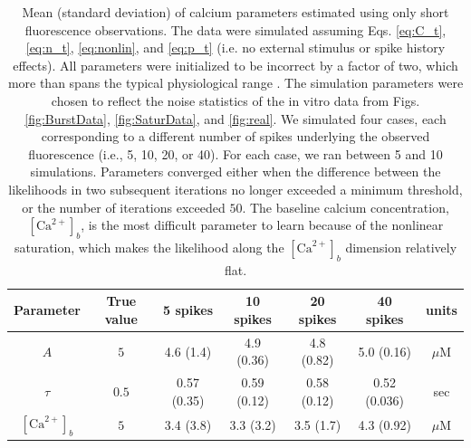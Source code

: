 \documentclass[10pt]{article}
\newcommand{\Ca}{[\text{Ca}^{2+}]}
\begin{document}
\begin{table}[h]
\caption{Mean (standard deviation) of calcium parameters estimated using only short fluorescence observations. The data were simulated assuming Eqs. \ref{eq:C_t}, \ref{eq:n_t}, \ref{eq:nonlin}, and \ref{eq:p_t} (i.e. no external stimulus or spike history effects). All parameters were initialized to be incorrect by a factor of two, which more than spans the typical physiological range \cite{YaksiFriedrich06}. The simulation parameters were chosen to reflect the noise statistics of the in vitro data from Figs. \ref{fig:BurstData}, \ref{fig:SaturData}, and \ref{fig:real}. We simulated four cases, each corresponding to a different number of spikes underlying the observed fluorescence (i.e., 5, 10, 20, or 40).  For each case, we ran between 5 and 10 simulations.  Parameters converged either when the difference between the likelihoods in two subsequent iterations no longer exceeded a minimum threshold, or the number of iterations exceeded $50$. The baseline calcium concentration, $\Ca_b$, is the most difficult parameter to learn because of the nonlinear saturation, which makes the likelihood along the $\Ca_b$ dimension relatively flat. }  \label{tab:params}
\vfil \hfil
\begin{tabular}{c|c|c|c|c|c|c}
Parameter & True value & 5 spikes & 10 spikes & 20 spikes & 40 spikes & units \\ \hline
$A$ & $5$ & 4.6 (1.4) & 4.9 (0.36) & 4.8 (0.82) & 5.0 (0.16) & $\mu$M \\
$\tau$ & $0.5$ & 0.57 (0.35) & 0.59 (0.12) & 0.58 (0.12) & 0.52 (0.036) & sec \\
$\Ca_b$ & $5$ & 3.4 (3.8) & 3.3 (3.2) & 3.5 (1.7) & 4.3 (0.92) & $\mu$M
\end{tabular}
\end{table}


\clearpage \newpage
\end{document}
